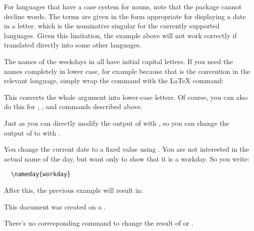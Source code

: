 For languages that have a case system for nouns, note that the package cannot
decline words. The terms are given in the form appropriate for displaying a
date in a letter, which is the nominative singular for the currently supported
languages. Given this limitation, the example above will not work correctly if
translated directly into some other languages.

\begin{Explain}
  The names of the weekdays in  all have
  initial capital letters. If you need the names completely in lower case, for
  example because that is the convention in the relevant language, simply wrap
  the command with the \LaTeX{} %
   command:
\begin{lstcode}
  \MakeLowercase{\todaysname}
\end{lstcode}
  This converts the whole argument into lower-case letters. Of course, you can
  also do this for
  ,
  , and
   commands described
  above.%
\end{Explain}%
\EndIndexGroup


\begin{Declaration}
\end{Declaration}%
Just as you can directly modify the output of  with
, so you can change the output of
 to  with .
\begin{Example}
  You change the current date to a fixed value using
  . You are not interested in the actual name of the
  day, but want only to show that it is a workday. So you write:
\begin{lstlisting}
  \nameday{workday}
\end{lstlisting}
  After this, the previous example will result in:
  \begin{ShowOutput}
    This document was created on a \todaysname.
  \end{ShowOutput}
\end{Example}
There's no corresponding command to change the result of
 or
.%
\EndIndexGroup


